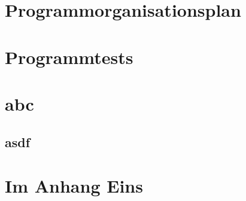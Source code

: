 \documentclass[a4paper, 11pt]{scrartcl}
\begin{document}
\section{Programmorganisationsplan}
\section{Programmtests}






\section{abc}
\subsection{asdf}
\blindtext


\clearpage
\appendix
{}
\thispagestyle{plain}
\section{Im Anhang Eins}
\end{document}
